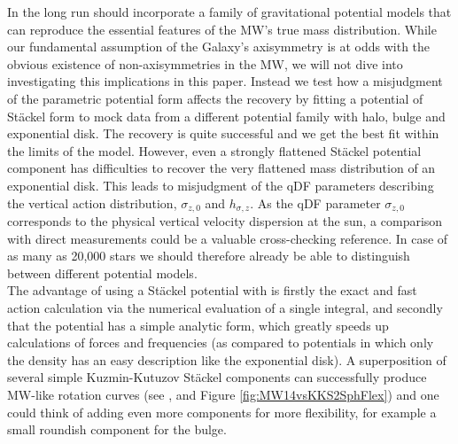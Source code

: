   In the long run \RM{} should incorporate a family of gravitational potential models that can reproduce the essential features of the MW's true mass distribution. While our fundamental assumption of the Galaxy's axisymmetry is at odds with the obvious existence of non-axisymmetries in the MW, we will not dive into investigating this implications in this paper. Instead we test how a misjudgment of the parametric potential form affects the recovery by fitting a potential of St\"{a}ckel form \citep{1994AA...287...43B} to mock data from a different potential family with halo, bulge and exponential disk. The recovery is quite successful and we get the best fit within the limits of the model. However, even a strongly flattened St\"{a}ckel potential component has difficulties to recover the very flattened mass distribution of an exponential disk. This leads to misjudgment of the qDF parameters describing the vertical action distribution, $\sigma_{z,0}$ and $h_{\sigma,z}$. As the qDF parameter $\sigma_{z,0}$ corresponds to the physical vertical velocity dispersion at the sun, a comparison with direct measurements could be a valuable cross-checking reference.  In case of as many as 20,000 stars we should therefore already be able to distinguish between different potential models.
\\The advantage of using a St\"{a}ckel potential with \RM{} is firstly the exact and fast action calculation via the numerical evaluation of a single integral, and secondly that the potential has a simple analytic form, which greatly speeds up calculations of forces and frequencies (as compared to potentials in which only the density has an easy description like the exponential disk). A superposition of several simple Kuzmin-Kutuzov St\"{a}ckel components can successfully produce MW-like rotation curves (see \citet{1994AA...287...43B}, \citet{2003MNRAS.340..752F} and Figure \ref{fig:MW14vsKKS2SphFlex}) and one could think of adding even more components for more flexibility, for example a small roundish component for the bulge. 
